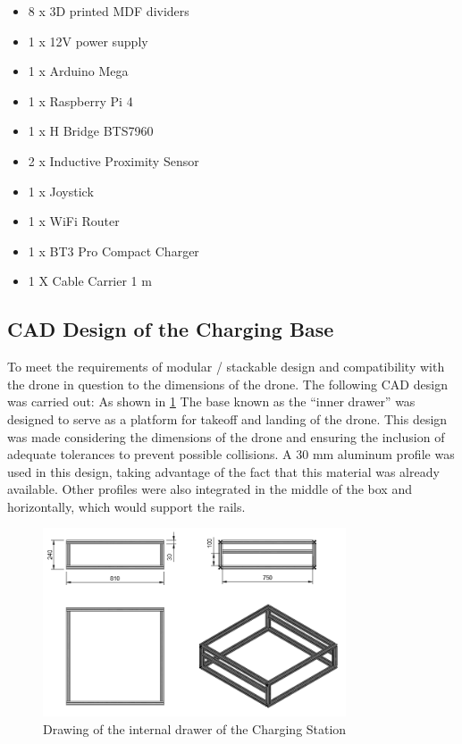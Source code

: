 \begin{itemize}
            \item 8 x 3D printed MDF dividers
            \item 1 x 12V power supply
            \item 1 x Arduino Mega
            \item 1 x Raspberry Pi 4
            \item 1 x H Bridge BTS7960 
            \item 2 x Inductive Proximity Sensor
            \item 1 x Joystick
            \item 1 x WiFi Router
            \item 1 x BT3 Pro Compact Charger
            \item 1 X Cable Carrier 1 m
    \end{itemize}

\subsection{CAD Design of the Charging Base}

To meet the requirements of modular / stackable design and compatibility with the drone in question to the dimensions of the drone. The following CAD design was carried out:
As shown in \ref{fig:etiqueta1} The base known as the “inner drawer” was designed to serve as a platform for takeoff and landing of the drone. This design was made considering the dimensions of the drone and ensuring the inclusion of adequate tolerances to prevent possible collisions. A 30 mm aluminum profile was used in this design, taking advantage of the fact that this material was already available. Other profiles were also integrated in the middle of the box and horizontally, which would support the rails.           
 \begin{figure}[htpb]
                \centering
                \includegraphics[width=0.8\textwidth]{pictures/PLANOS_CAJON_INTERNO_1.png}
                \caption{Drawing of the internal drawer of the Charging Station}
                \label{fig:etiqueta1}
            \end{figure}
            

